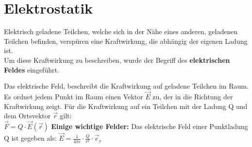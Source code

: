 
\section{Elektrostatik}
\label{chap:Style}


Elektrisch geladene Teilchen, welche sich in der Nähe eines anderen, geladenen Teilchen befinden, verspüren eine Kraftwirkung, die abhängig der eigenen Ladung ist. \\
Um diese Kraftwirkung zu beschreiben, wurde der Begriff des \textbf{elektrischen Feldes} eingeführt.

\beginip
Das elektrische Feld, beschreibt die Kraftwirkung auf geladene Teilchen im Raum. \\
Es ordnet jedem Punkt im Raum einen Vektor $\vec{E}$ zu, der in die Richtung der Kraftwirkung zeigt.
Für die Kraftwirkung auf ein Teilchen mit der Ladung Q und dem Ortsvektor $\vec{r}$ gilt: \\
\formulaBegin
$\vec{F} = Q \cdot \vec{E}(\vec{r})$
\formulaEnd
\iend
\fspace
\textbf{Einige wichtige Felder:}
\beginbsp
Das elektrische Feld einer Punktladung Q ist gegeben als:
\formulaBegin
$\displaystyle \vec{E} = \frac{1}{4 \pi \epsilon} \cdot \frac{Q}{r^2}\cdot \vec{e}_r$
\formulaEnd
\begin{center}
\end{center}
\iend

\newpage


